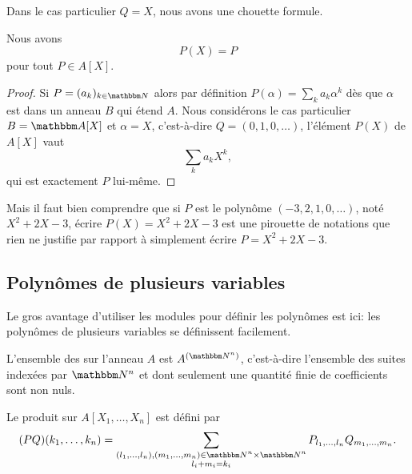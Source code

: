 Dans le cas particulier \( Q=X\), nous avons une chouette formule.
\begin{lemma}       \label{LEMooGKWQooVOyeDX}
    Nous avons
    \begin{equation}
        P(X)=P
    \end{equation}
    pour tout \( P\in A[X]\).
\end{lemma}

\begin{proof}
    Si \( P=(a_k)_{k\in \eN}\) alors par définition \( P(\alpha)=\sum_ka_k\alpha^k\) dès que \( \alpha\) est dans un anneau \( B\) qui étend \( A\). Nous considérons le cas particulier \( B=\eA[X]\) et \( \alpha=X\), c'est-à-dire \( Q=(0,1,0,\ldots)\), l'élément \( P(X)\) de \( A[X]\) vaut
    \begin{equation}        \label{EQooABULooFCEasf}
        \sum_ka_kX^k,
    \end{equation}
    qui est exactement \( P\) lui-même.
\end{proof}

Mais il faut bien comprendre que si \( P\) est le polynôme \( (-3,2,1,0,\ldots)\), noté \( X^2+2X-3\), écrire \( P(X)=X^2+2X-3\) est une pirouette de notations que rien ne justifie par rapport à simplement écrire \( P=X^2+2X-3\).

\subsection{Polynômes de plusieurs variables}

Le gros avantage d'utiliser les modules pour définir les polynômes est ici: les polynômes de plusieurs variables se définissent facilement.

\begin{definition}      \label{DEFooZNHOooCruuwI}
    L'ensemble des  sur l'anneau \( A\) est \( A^{(\eN^n)}\), c'est-à-dire l'ensemble des suites indexées par \( \eN^n\) et dont seulement une quantité finie de coefficients sont non nuls.

    Le produit sur \( A[X_1,\ldots, X_n]\) est défini par
    \begin{equation}
        (PQ)(k_1,\ldots, k_n)=\sum_{\substack{ (l_1,\ldots, l_n),(m_1,\ldots, m_n)\in \eN^n\times \eN^n   \\l_i+m_i=k_i}}P_{l_1,\ldots, l_n}Q_{m_1,\ldots, m_n}.
        \end{equation}
\end{definition}

